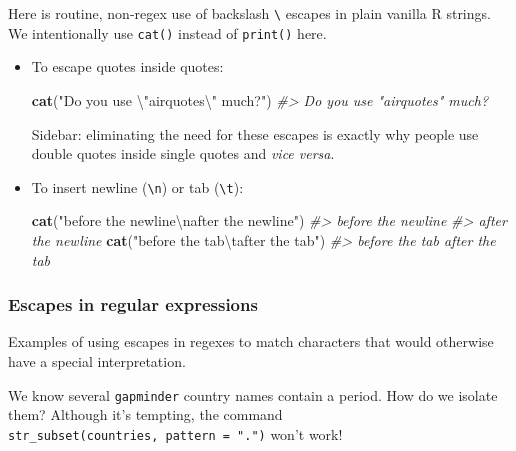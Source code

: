 \documentclass[
]{book}
\newenvironment{Shaded}{\begin{snugshade}}{\end{snugshade}}
\newcommand{\CharTok}[1]{\textcolor[rgb]{0.31,0.60,0.02}{#1}}
\newcommand{\CommentTok}[1]{\textcolor[rgb]{0.56,0.35,0.01}{\textit{#1}}}
\newcommand{\KeywordTok}[1]{\textcolor[rgb]{0.13,0.29,0.53}{\textbf{#1}}}
\newcommand{\NormalTok}[1]{#1}
\newcommand{\StringTok}[1]{\textcolor[rgb]{0.31,0.60,0.02}{#1}}
\begin{document}
Here is routine, non-regex use of backslash \texttt{\textbackslash{}} escapes in plain vanilla R strings. We intentionally use \texttt{cat()} instead of \texttt{print()} here.

\begin{itemize}
\item
  To escape quotes inside quotes:

\begin{Shaded}
\begin{Highlighting}[]
\KeywordTok{cat}\NormalTok{(}\StringTok{"Do you use }\CharTok{\textbackslash{}"}\StringTok{airquotes}\CharTok{\textbackslash{}"}\StringTok{ much?"}\NormalTok{)}
\CommentTok{#> Do you use "airquotes" much?}
\end{Highlighting}
\end{Shaded}

  Sidebar: eliminating the need for these escapes is exactly why people use double quotes inside single quotes and \emph{vice versa}.
\item
  To insert newline (\texttt{\textbackslash{}n}) or tab (\texttt{\textbackslash{}t}):

\begin{Shaded}
\begin{Highlighting}[]
\KeywordTok{cat}\NormalTok{(}\StringTok{"before the newline}\CharTok{\textbackslash{}n}\StringTok{after the newline"}\NormalTok{)}
\CommentTok{#> before the newline}
\CommentTok{#> after the newline}
\KeywordTok{cat}\NormalTok{(}\StringTok{"before the tab}\CharTok{\textbackslash{}t}\StringTok{after the tab"}\NormalTok{)}
\CommentTok{#> before the tab	after the tab}
\end{Highlighting}
\end{Shaded}
\end{itemize}

\hypertarget{escapes-in-regular-expressions}{%
\subsubsection{Escapes in regular expressions}\label{escapes-in-regular-expressions}}

Examples of using escapes in regexes to match characters that would otherwise have a special interpretation.

We know several \texttt{gapminder} country names contain a period. How do we isolate them? Although it's tempting, the command \texttt{str\_subset(countries,\ pattern\ =\ ".")} won't work!
\end{document}
